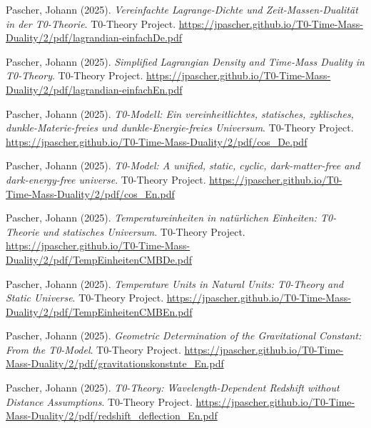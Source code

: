 \documentclass[12pt,a4paper]{article}
\theoremstyle{definition}
\begin{document}
	
	\begin{thebibliography}{99}
		
		Pascher, Johann (2025). 
		\textit{Vereinfachte Lagrange-Dichte und Zeit-Massen-Dualität in der T0-Theorie}. 
		T0-Theory Project. 
		\url{https://jpascher.github.io/T0-Time-Mass-Duality/2/pdf/lagrandian-einfachDe.pdf}
		
		Pascher, Johann (2025). 
		\textit{Simplified Lagrangian Density and Time-Mass Duality in T0-Theory}. 
		T0-Theory Project. 
		\url{https://jpascher.github.io/T0-Time-Mass-Duality/2/pdf/lagrandian-einfachEn.pdf}
		
		Pascher, Johann (2025). 
		\textit{T0-Modell: Ein vereinheitlichtes, statisches, zyklisches, dunkle-Materie-freies und dunkle-Energie-freies Universum}. 
		T0-Theory Project. 
		\url{https://jpascher.github.io/T0-Time-Mass-Duality/2/pdf/cos_De.pdf}
		
		Pascher, Johann (2025). 
		\textit{T0-Model: A unified, static, cyclic, dark-matter-free and dark-energy-free universe}. 
		T0-Theory Project. 
		\url{https://jpascher.github.io/T0-Time-Mass-Duality/2/pdf/cos_En.pdf}
		
		Pascher, Johann (2025). 
		\textit{Temperatureinheiten in natürlichen Einheiten: T0-Theorie und statisches Universum}. 
		T0-Theory Project. 
		\url{https://jpascher.github.io/T0-Time-Mass-Duality/2/pdf/TempEinheitenCMBDe.pdf}
		
		Pascher, Johann (2025). 
		\textit{Temperature Units in Natural Units: T0-Theory and Static Universe}. 
		T0-Theory Project. 
		\url{https://jpascher.github.io/T0-Time-Mass-Duality/2/pdf/TempEinheitenCMBEn.pdf}
		
		Pascher, Johann (2025). 
		\textit{Geometric Determination of the Gravitational Constant: From the T0-Model}. 
		T0-Theory Project. 
		\url{https://jpascher.github.io/T0-Time-Mass-Duality/2/pdf/gravitationskonstnte_En.pdf}
		
		
		
		Pascher, Johann (2025). 
		\textit{T0-Theory: Wavelength-Dependent Redshift without Distance Assumptions}. 
		T0-Theory Project. 
		\url{https://jpascher.github.io/T0-Time-Mass-Duality/2/pdf/redshift_deflection_En.pdf}
		

\end{thebibliography}
\end{document}

